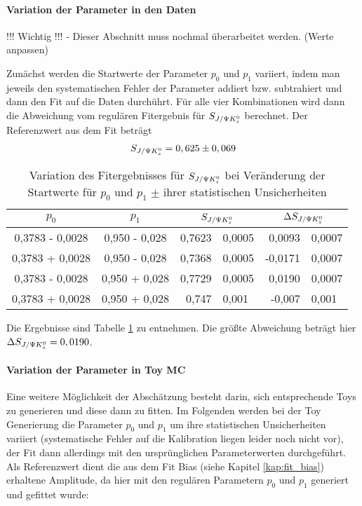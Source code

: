 \paragraph{Variation der Parameter in den Daten}
!!! Wichtig !!! - Dieser Abschnitt muss nochmal überarbeitet werden. (Werte anpassen)

Zunächst werden die Startwerte der Parameter $p_0$ und $p_1$ variiert, indem man jeweils den systematischen Fehler der Parameter addiert bzw. subtrahiert und dann den Fit auf die Daten durchührt. Für alle vier Kombinationen wird dann die Abweichung vom regulären Fitergebnis für $S_{J/\Psi K_s^0}$ berechnet. Der Referenzwert aus dem Fit beträgt
\begin{align}
S_{J/\Psi K_s^0} = 0,625 \pm 0,069
\end{align}

\begin{table}[hptb]
\centering
\caption{Variation des Fitergebnisses für $S_{J/\Psi K_s^0}$ bei Veränderung der Startwerte für $p_0$ und $p_1$ $\pm$ ihrer statistischen Unsicherheiten}
\label{tab:syst_fit_calib_data}
\begin{tabular}{cc|r@{$\pm$}l|r@{$\pm$}l}
\hline\hline
$p_0$  &  $p_1$  &  \multicolumn{2}{c}{$S_{J/\Psi K_s^0}$}  & \multicolumn{2}{c}{$\Delta S_{J/\Psi K_s^0}$}   \\ \hline
0,3783 - 0,0028  &  0,950 - 0,028  &  0,7623 & 0,0005  &   0,0093 & 0,0007 \\
0,3783 + 0,0028  &  0,950 - 0,028  &  0,7368 & 0,0005  &  -0,0171 & 0,0007 \\
0,3783 - 0,0028  &  0,950 + 0,028  &  0,7729 & 0,0005  &   0,0190 & 0,0007 \\
0,3783 + 0,0028  &  0,950 + 0,028  &  0,747  & 0,001   &  -0,007  & 0,001 \\
\hline\hline
\end{tabular}
\end{table}

Die Ergebnisse sind Tabelle \ref{tab:syst_fit_calib_data} zu entnehmen. Die größte Abweichung beträgt hier $\Delta S_{J/\Psi K_s^0} = 0,0190$.

\paragraph{Variation der Parameter in \gls{Toy MC}}
Eine weitere Möglichkeit der Abschätzung besteht darin, sich entsprechende Toys zu generieren und diese dann zu fitten. Im Folgenden werden bei der Toy Generierung die Parameter $p_0$ und $p_1$ um ihre statistischen Unsicherheiten variiert (systematische Fehler auf die Kalibration liegen leider noch nicht vor), der Fit dann allerdings mit den ursprünglichen Parameterwerten durchgeführt. Als Referenzwert dient die aus dem Fit Bias (siehe Kapitel \ref{kap:fit_bias}) erhaltene Amplitude, da hier mit den regulären Parametern $p_0$ und $p_1$ generiert und gefittet wurde:

